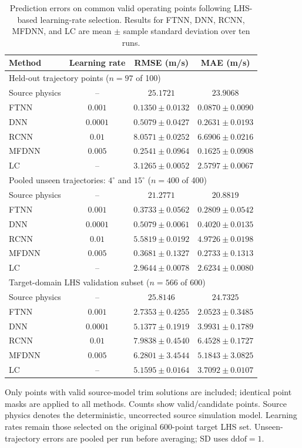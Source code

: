 \begin{table}[width=\linewidth,cols=4,pos=htbp]
\caption{Prediction errors on common valid operating points following LHS-based learning-rate selection. Results for FTNN, DNN, RCNN, MFDNN, and LC are mean $\pm$ sample standard deviation over ten runs.}
\label{tab:selected-model-comparison}
\small
\begin{tabular*}{\tblwidth}{@{\extracolsep{\fill}}lccc@{}}
\toprule
Method & Learning rate & RMSE (m/s) & MAE (m/s) \\
\midrule
\multicolumn{4}{l}{Held-out trajectory points ($n=97$ of 100)} \\
Source physics & -- & $25.1721$ & $23.9068$ \\
FTNN & $0.001$ & $0.1350\pm0.0132$ & $0.0870\pm0.0090$ \\
DNN & $0.0001$ & $0.5079\pm0.0427$ & $0.2631\pm0.0193$ \\
RCNN & $0.01$ & $8.0571\pm0.0252$ & $6.6906\pm0.0216$ \\
MFDNN & $0.005$ & $0.2541\pm0.0964$ & $0.1625\pm0.0908$ \\
LC & -- & $3.1265\pm0.0052$ & $2.5797\pm0.0067$ \\
\midrule
\multicolumn{4}{l}{Pooled unseen trajectories: $4^\circ$ and $15^\circ$ ($n=400$ of 400)} \\
Source physics & -- & $21.2771$ & $20.8819$ \\
FTNN & $0.001$ & $0.3733\pm0.0562$ & $0.2809\pm0.0542$ \\
DNN & $0.0001$ & $0.5079\pm0.0061$ & $0.4020\pm0.0135$ \\
RCNN & $0.01$ & $5.5819\pm0.0192$ & $4.9726\pm0.0198$ \\
MFDNN & $0.005$ & $0.3681\pm0.1327$ & $0.2733\pm0.1313$ \\
LC & -- & $2.9644\pm0.0078$ & $2.6234\pm0.0080$ \\
\midrule
\multicolumn{4}{l}{Target-domain LHS validation subset ($n=566$ of 600)} \\
Source physics & -- & $25.8146$ & $24.7325$ \\
FTNN & $0.001$ & $2.7353\pm0.4255$ & $2.0523\pm0.3485$ \\
DNN & $0.0001$ & $5.1377\pm0.1919$ & $3.9931\pm0.1789$ \\
RCNN & $0.01$ & $7.9838\pm0.4540$ & $6.4528\pm0.1727$ \\
MFDNN & $0.005$ & $6.2801\pm3.4544$ & $5.1843\pm3.0825$ \\
LC & -- & $5.1595\pm0.0164$ & $3.7092\pm0.0107$ \\
\bottomrule
\end{tabular*}
\smallskip
\footnotesize
Only points with valid source-model trim solutions are included; identical point masks are applied to all methods. Counts show valid/candidate points. Source physics denotes the deterministic, uncorrected source simulation model. Learning rates remain those selected on the original 600-point target LHS set. Unseen-trajectory errors are pooled per run before averaging; SD uses $\mathrm{ddof}=1$.
\end{table}
